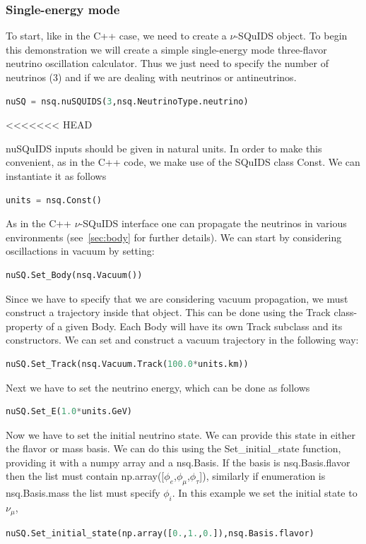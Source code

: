 \documentclass[3p,12pt]{elsarticle}
\newcommand{\ttf}{\ttfamily}
\begin{document}
\subsubsection{Single-energy mode}

To start, like in the {\ttf C++} case, we need to create a $\nu$-SQuIDS object. 
To begin this demonstration we will create a simple single-energy mode three-flavor neutrino oscillation calculator.
Thus we just need to specify the number of neutrinos (3) and if we are dealing with neutrinos or antineutrinos.
\begin{lstlisting}[language=Python, breaklines=true]
nuSQ = nsq.nuSQUIDS(3,nsq.NeutrinoType.neutrino)
\end{lstlisting}
<<<<<<< HEAD

nuSQuIDS inputs should be given in natural units.
In order to make this convenient, as in the {\ttf C++} code, we make use of the {\ttf SQuIDS} class {\ttf Const}.
We can instantiate it as follows
\begin{lstlisting}[language=Python, breaklines=true]
units = nsq.Const()
\end{lstlisting}

As in the {\ttf C++} $\nu$-SQuIDS interface one can propagate the neutrinos in various environments
(see~\ref{sec:body} for further details). We can start by considering oscillactions in vacuum by setting:
\begin{lstlisting}[language=Python, breaklines=true]
nuSQ.Set_Body(nsq.Vacuum())
\end{lstlisting}

Since we have to specify that we are considering vacuum propagation, 
we must construct a trajectory inside that object. This can be done using the {\ttf Track} class-property of a given {\ttf Body}.
Each {\ttf Body} will have its own {\ttf Track} subclass and its constructors. We can set and construct a vacuum trajectory in the following way:
\begin{lstlisting}[language=Python, breaklines=true]
nuSQ.Set_Track(nsq.Vacuum.Track(100.0*units.km))
\end{lstlisting}

Next we have to set the neutrino energy, which can be done as follows
\begin{lstlisting}[language=Python, breaklines=true]
nuSQ.Set_E(1.0*units.GeV)
\end{lstlisting}

Now we have to set the initial neutrino state. We can provide this state in either the flavor or mass basis.
We can do this using the {\ttf Set\_initial\_state} function, providing it with a numpy array and a {\ttf nsq.Basis}.
If the basis is {\ttf nsq.Basis.flavor} then the list must contain {\ttf np.array([}$\phi_e$,$\phi_\mu$,$\phi_\tau${\ttf ])}, 
similarly if enumeration is {\ttf nsq.Basis.mass} the list must specify $\phi_i$.
In this example we set the initial state to $\nu_\mu$,
\begin{lstlisting}[language=Python, breaklines=true]
nuSQ.Set_initial_state(np.array([0.,1.,0.]),nsq.Basis.flavor)
\end{lstlisting}
\end{document}
